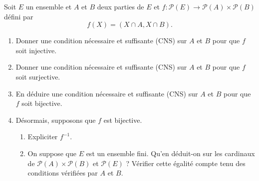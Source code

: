 \documentclass[../PolyS4.tex]{subfiles}
\begin{document}






Soit $E$ un ensemble et $A$ et $B$ deux parties de $E$ et $f : \mathcal{P}(E) \to \mathcal{P}(A) \times \mathcal{P}(B)$ défini par 
$$
f(X) = (X \cap A, X \cap B).
$$

\begin{enumerate}
    \item Donner une condition nécessaire et suffisante (CNS) sur $A$ et $B$ pour que $f$ soit injective.

\item Donner une condition nécessaire et suffisante (CNS) sur $A$ et $B$ pour que $f$ soit surjective.

\item En déduire une condition nécessaire et suffisante (CNS) sur $A$ et $B$ pour que $f$ soit bijective.

\item Désormais, supposons que $f$ est bijective.
   \begin{enumerate}
    \item Expliciter $f^{-1}$.
   \item On suppose que $E$ est un ensemble fini. Qu'en déduit-on sur les cardinaux de $\mathcal{P}(A) \times \mathcal{P}(B)$ et $\mathcal{P}(E)$ ? Vérifier cette égalité compte tenu des conditions vérifiées par $A$ et $B$.\\
   \end{enumerate}
   \end{enumerate}
\end{document}
